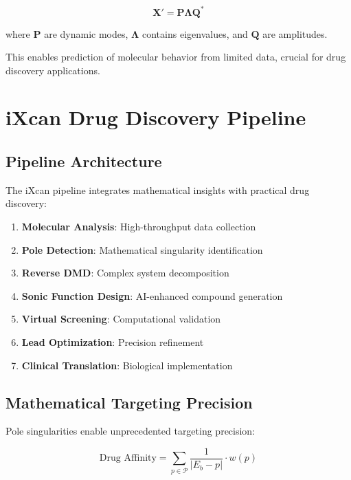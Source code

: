 \documentclass[12pt,a4paper]{article}
\begin{document}
\begin{equation}
\mathbf{X}' = \mathbf{P} \mathbf{\Lambda} \mathbf{Q}^*
\label{eq:reverse_dmd}
\end{equation}

where $\mathbf{P}$ are dynamic modes, $\mathbf{\Lambda}$ contains eigenvalues, and $\mathbf{Q}$ are amplitudes.

This enables prediction of molecular behavior from limited data, crucial for drug discovery applications.

\section{iXcan Drug Discovery Pipeline}

\subsection{Pipeline Architecture}

The iXcan pipeline integrates mathematical insights with practical drug discovery:

\begin{enumerate}
\item \textbf{Molecular Analysis}: High-throughput data collection
\item \textbf{Pole Detection}: Mathematical singularity identification
\item \textbf{Reverse DMD}: Complex system decomposition
\item \textbf{Sonic Function Design}: AI-enhanced compound generation
\item \textbf{Virtual Screening}: Computational validation
\item \textbf{Lead Optimization}: Precision refinement
\item \textbf{Clinical Translation}: Biological implementation
\end{enumerate}

\subsection{Mathematical Targeting Precision}

Pole singularities enable unprecedented targeting precision:

\begin{equation}
\text{Drug Affinity} = \sum_{p \in \mathcal{P}} \frac{1}{|E_b - p|} \cdot w(p)
\label{eq:drug_affinity}
\end{equation}
\end{document}
